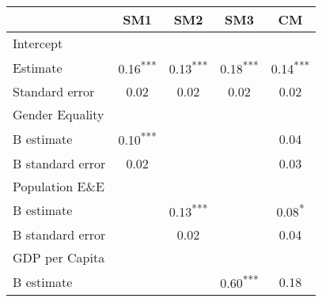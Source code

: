 \centering
\small
\begin{tabular}{lcccc}
\toprule
                                            & SM1                         & SM2                       & SM3                       & CM                        \\ \midrule
  Intercept                                 &                             &                           &                           &                           \\
  \hspace{10mm} Estimate                    & 0.16\textsuperscript{***}   & 0.13\textsuperscript{***} & 0.18\textsuperscript{***} & 0.14\textsuperscript{***} \\
  \hspace{10mm} Standard error              & 0.02                        & 0.02                      & 0.02                      & 0.02                      \\
  Gender Equality                           &                             &                           &                           &                           \\
  \hspace{10mm} B estimate                  & 0.10\textsuperscript{***}   &                           &                           & 0.04                      \\
  \hspace{10mm} B standard error            & 0.02                        &                           &                           & 0.03                      \\
  Population E\&E                           &                             &                           &                           &                           \\
  \hspace{10mm} B estimate                  &                             & 0.13\textsuperscript{***} &                           & 0.08\textsuperscript{*}   \\
  \hspace{10mm} B standard error            &                             & 0.02                      &                           & 0.04                      \\
  GDP per Capita                            &                             &                           &                           &                           \\
  \hspace{10mm} B estimate                  &                             &                           & 0.60\textsuperscript{***} & 0.18                      \\

\end{tabular}
